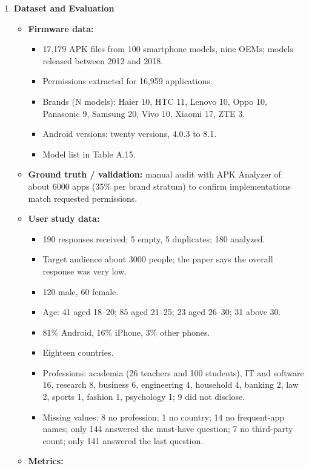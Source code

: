 \documentclass[11pt,a4paper]{article}
\newcommand{\entrypart}[1]{\textbf{\color{accent}#1}\par\vspace{2pt}}
\begin{document}
\begin{enumerate}
    \item \entrypart{Dataset and Evaluation}
    \begin{itemize}[leftmargin=*, itemsep=1pt, topsep=2pt]
        \item \textbf{Firmware data:}
        \begin{itemize}[itemsep=0pt]
            \item 17,179 APK files from 100 smartphone models, nine OEMs; models released between 2012 and 2018.
            \item Permissions extracted for 16,959 applications.
            \item Brands (N models): Haier 10, HTC 11, Lenovo 10, Oppo 10, Panasonic 9, Samsung 20, Vivo 10, Xiaomi 17, ZTE 3.
            \item Android versions: twenty versions, 4.0.3 to 8.1.
            \item Model list in Table A.15.
        \end{itemize}
        \item \textbf{Ground truth / validation:} manual audit with APK Analyzer of about 6000 apps (35\% per brand stratum) to confirm implementations match requested permissions.
        \item \textbf{User study data:}
        \begin{itemize}[itemsep=0pt]
            \item 190 responses received; 5 empty, 5 duplicates; 180 analyzed.
            \item Target audience about 3000 people; the paper says the overall response was very low.
            \item 120 male, 60 female.
            \item Age: 41 aged 18--20; 85 aged 21--25; 23 aged 26--30; 31 above 30.
            \item 81\% Android, 16\% iPhone, 3\% other phones.
            \item Eighteen countries.
            \item Professions: academia (26 teachers and 100 students), IT and software 16, research 8, business 6, engineering 4, household 4, banking 2, law 2, sports 1, fashion 1, psychology 1; 9 did not disclose.
            \item Missing values: 8 no profession; 1 no country; 14 no frequent-app names; only 144 answered the must-have question; 7 no third-party count; only 141 answered the last question.
        \end{itemize}
        \item \textbf{Metrics:}

\end{itemize}
\end{enumerate}
\end{document}
